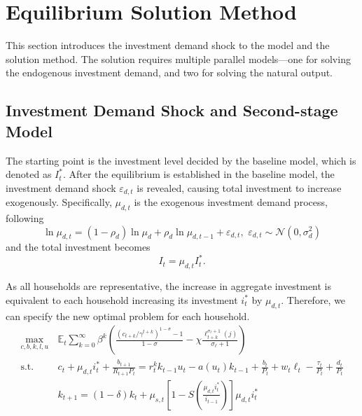 \section{Equilibrium Solution Method}
\label{sec:solution}
This section introduces the investment demand shock to the model and the solution method. The solution requires multiple parallel models---one for solving the endogenous investment demand, and two for solving the natural output.

\subsection{Investment Demand Shock and Second-stage Model}
The starting point is the investment level decided by the baseline model, which is denoted as $I^*_t$. After the equilibrium is established in the baseline model, the investment demand shock $\varepsilon_{d, t}$ is revealed, causing total investment to increase exogenously. Specifically, $\mu_{d, t}$ is the exogenous investment demand process, following
\begin{equation}
    \ln \mu_{d, t} = (1 - \rho_d) \ln \mu_d + \rho_d \ln \mu_{d, t-1} + \varepsilon_{d, t},\,\, \varepsilon_{d, t} \sim \mathcal{N}(0, \sigma_d^2)
\end{equation}
and the total investment becomes
\begin{equation}\label{eq:invest_law}
    I_t = \mu_{d, t} I^*_t .
\end{equation}

As all households are representative, the increase in aggregate investment is equivalent to each household increasing its investment $i_t^*$ by $\mu_{d,t}$. Therefore, we can specify the new optimal problem for each household.
\begin{equation}\label{eq:new_hh_optimal}
    \begin{aligned}
        \max\limits_{c, b, k, l, u} \, &\mathbb{E}_t \sum_{k=0}^{\infty} \beta^k \left(\frac{(c_{t+k} / \gamma^{t+k})^{1-\sigma} - 1}{1 - \sigma} - \chi\frac{\ell_{t+k}^{\sigma_\ell + 1}(j)}{\sigma_\ell + 1}\right) \\
        \text{s.t.  } & c_t + \mu_{d, t} i^*_t + \frac{b_{t+1}}{R_{t+1}P_t} = r^k_t k_{t-1}u_t - a(u_t)k_{t-1} + \frac{b_t}{P_t} + w_t \ell_t - \frac{\tau_t}{P_t} + \frac{d_t}{P_t} \\
        &k_{t+1} = (1 - \delta) k_t + \mu_{s, t}\left[1 - S\left(\frac{\mu_{d, t} i^*_t}{i_{t-1}}\right)\right] \mu_{d,t} i^*_t
    \end{aligned}
\end{equation}

